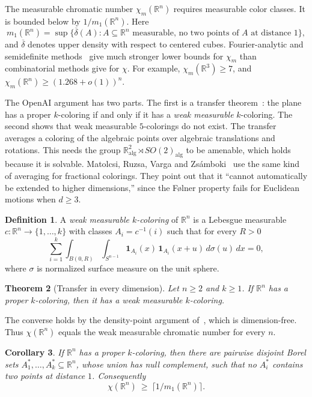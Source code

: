 \documentclass[11pt]{amsart}
\newtheorem{theorem}{Theorem}[section]
\newtheorem{corollary}[theorem]{Corollary}
\theoremstyle{definition}
\newtheorem{definition}[theorem]{Definition}
\newcommand{\R}{\mathbb{R}}
\begin{document}
The measurable chromatic number $\chi_m(\R^n)$ requires measurable color classes. It is bounded below by $1/m_1(\R^n)$. Here
\[
m_1(\R^n)=\sup\{\overline{\delta}(A): A\subseteq\R^n\text{ measurable, no two points of }A\text{ at distance }1\},
\]
and $\overline\delta$ denotes upper density with respect to centered cubes. Fourier-analytic and semidefinite methods~\cite{OV,BPT,DOV} give much stronger lower bounds for $\chi_m$ than combinatorial methods give for $\chi$. For example, $\chi_m(\R^3)\ge7$, and $\chi_m(\R^n)\ge(1.268+o(1))^n$.

The OpenAI argument has two parts. The first is a transfer theorem~\cite[Theorem 1.3]{OAI}: the plane has a proper $k$-coloring if and only if it has a \emph{weak measurable} $k$-coloring. The second shows that weak measurable $5$-colorings do not exist. The transfer averages a coloring of the algebraic points over algebraic translations and rotations. This needs the group $\R^2_{\mathrm{alg}}\rtimes SO(2)_{\mathrm{alg}}$ to be amenable, which holds because it is solvable. Matolcsi, Ruzsa, Varga and Zsámboki~\cite{MRVZ} use the same kind of averaging for fractional colorings. They point out that it ``cannot automatically be extended to higher dimensions,'' since the Følner property fails for Euclidean motions when $d\ge3$.

\begin{definition}\label{def:weak}
A \emph{weak measurable $k$-coloring} of $\R^n$ is a Lebesgue measurable $c\colon\R^n\to\{1,\dots,k\}$ with classes $A_i=c^{-1}(i)$ such that for every $R>0$
\[
\sum_{i=1}^k\int_{B(0,R)}\int_{S^{n-1}}\mathbf 1_{A_i}(x)\,\mathbf 1_{A_i}(x+u)\,d\sigma(u)\,dx=0 ,
\]
where $\sigma$ is normalized surface measure on the unit sphere.
\end{definition}

\begin{theorem}[Transfer in every dimension]\label{thm:A}
Let $n\ge2$ and $k\ge1$. If $\R^n$ has a proper $k$-coloring, then it has a weak measurable $k$-coloring.
\end{theorem}

The converse holds by the density-point argument of~\cite[Lemma 4.3 and proof of Theorem 1.3]{OAI}, which is dimension-free. Thus $\chi(\R^n)$ equals the weak measurable chromatic number for every $n$.

\begin{corollary}\label{cor:B}
If $\R^n$ has a proper $k$-coloring, then there are pairwise disjoint Borel sets $A_1^*,\dots,A_k^*\subseteq\R^n$, whose union has null complement, such that no $A_i^*$ contains two points at distance $1$. Consequently
\[
\chi(\R^n)\ \ge\ \lceil 1/m_1(\R^n)\rceil .
\]
\end{corollary}
\end{document}
